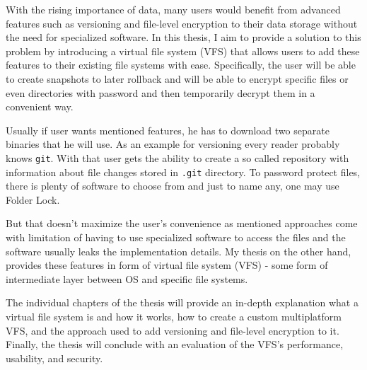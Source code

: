 

With the rising importance of data, many users would benefit from advanced features such as versioning and file-level
encryption to their data storage without the need for specialized software.
In this thesis, I aim to provide a solution to this problem by introducing a virtual file system (VFS) that allows users
to add these features to their existing file systems with ease.
Specifically, the user will be able to create snapshots to later rollback and will be able to encrypt specific files or
even directories with password and then temporarily decrypt them in a convenient way.

Usually if user wants mentioned features, he has to download two separate binaries that he will use.
As an example for versioning every reader probably knows \texttt{git}.
With that user gets the ability to create a so called repository with information about file changes stored in \texttt{.git} directory.
To password protect files, there is plenty of software to choose from and just to name any, one may use Folder Lock.

But that doesn't maximize the user's convenience as mentioned approaches come with limitation of having to use specialized
software to access the files and the software usually leaks the implementation details.
My thesis on the other hand, provides these features in form of virtual file system (VFS) - some form of intermediate layer
between OS and specific file systems.

The individual chapters of the thesis will provide an in-depth explanation what a virtual file system is and how it works,
how to create a custom multiplatform VFS, and the approach used to add versioning and file-level encryption to it.
Finally, the thesis will conclude with an evaluation of the VFS's performance, usability, and security.